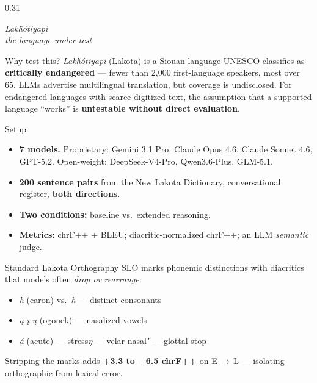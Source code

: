 \documentclass[final]{beamer}
\newcommand{\lak}[1]{\textit{#1}}
\begin{document}
\begin{frame}[t]
\begin{columns}[t]
\begin{column}{0.31\paperwidth}

\centering
{\rmfamily\itshape\fontsize{50}{56}\selectfont\color{accent} Lakȟótiyapi}\\[2pt]
{\fontsize{18}{22}\selectfont\color{midgray}\emph{the language under test}}
\vspace{14pt}

\begin{block}{Why test this?}
\lak{Lakȟótiyapi} (Lakota) is a Siouan language UNESCO classifies as \textbf{critically endangered} --- fewer than 2,000 first-language speakers, most over 65. LLMs advertise multilingual translation, but coverage is undisclosed. For endangered languages with scarce digitized text, the assumption that a supported language ``works'' is \textbf{untestable without direct evaluation}.
\end{block}

\begin{block}{Setup}
\begin{itemize}
\item \textbf{7 models.} Proprietary: Gemini 3.1 Pro, Claude Opus 4.6, Claude Sonnet 4.6, GPT-5.2. Open-weight: DeepSeek-V4-Pro, Qwen3.6-Plus, GLM-5.1.
\item \textbf{200 sentence pairs} from the New Lakota Dictionary, conversational register, \textbf{both directions}.
\item \textbf{Two conditions:} baseline vs.\ extended reasoning.
\item \textbf{Metrics:} chrF++ + BLEU; diacritic-normalized chrF++; an LLM \emph{semantic} judge.
\end{itemize}
\end{block}

\begin{block}{Standard Lakota Orthography}
SLO marks phonemic distinctions with diacritics that models often \emph{drop or rearrange}:
\smallskip
\begin{itemize}
\item \lak{ȟ} (caron) vs.\ \lak{h} --- distinct consonants
\item \lak{ą} \lak{į} \lak{ų} (ogonek) --- nasalized vowels
\item \lak{á} (acute) --- stress\;\;\textperiodcentered\;\;\lak{ŋ} --- velar nasal\;\;\textperiodcentered\;\;\lak{ʼ} --- glottal stop
\end{itemize}
\smallskip
Stripping the marks adds \textbf{+3.3 to +6.5 chrF++} on E\,$\rightarrow$\,L --- isolating orthographic from lexical error.
\end{block}


\end{column}
\end{columns}
\end{frame}
\end{document}

